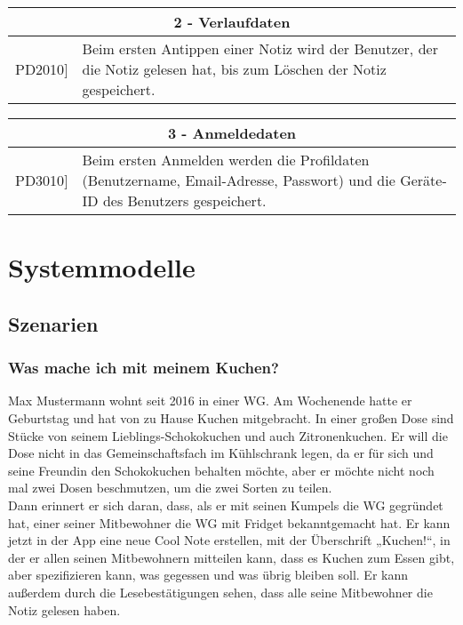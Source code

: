 \documentclass[a4paper]{scrreprt}
\begin{document}
        \vspace{5mm}
        
    	\begin{table}[h!]
    		\centering
    		\label{my-label}
    		\begin{tabular}{p{2cm}p{12cm}}
    			
    			\multicolumn{2}{c}{\textbf{2 - Verlaufdaten}} \\ \hline
    			\centering{[}PD2010{]} & Beim ersten Antippen einer Notiz wird der Benutzer, der die Notiz gelesen hat, bis zum Löschen der Notiz gespeichert.\\ 
    			\hline
    		\end{tabular}
    	\end{table}
    	
    	\vspace{5mm}
    	
    	\begin{table}[h!]
    		\centering
    		\label{my-label}
    		\begin{tabular}{p{2cm}p{12cm}}
    			
    			\multicolumn{2}{c}{\textbf{3 - Anmeldedaten}} \\ \hline
    			\centering{[}PD3010{]} & Beim ersten Anmelden werden die Profildaten (Benutzername, Email-Adresse, Passwort) und die Geräte-ID des Benutzers gespeichert.\\ 
    			\hline
    		\end{tabular}
    	\end{table}
    
    \chapter{Systemmodelle}
        \section{Szenarien}
        
        
        \subsection{Was mache ich mit meinem Kuchen?}
        Max Mustermann wohnt seit 2016 in einer WG. Am Wochenende hatte er Geburtstag und hat von zu Hause Kuchen mitgebracht. In einer großen Dose sind Stücke von seinem Lieblings-Schokokuchen und auch Zitronenkuchen. Er will die Dose nicht in das Gemeinschaftsfach im Kühlschrank legen, da er für sich und seine Freundin den Schokokuchen behalten möchte, aber er möchte nicht noch mal zwei Dosen beschmutzen, um die zwei Sorten zu teilen.\\
        Dann erinnert er sich daran, dass, als er mit seinen Kumpels die WG gegründet hat, einer seiner Mitbewohner die WG mit Fridget bekanntgemacht hat. Er kann jetzt in der App eine neue Cool Note erstellen, mit der Überschrift „Kuchen!“, in der er allen seinen Mitbewohnern mitteilen kann, dass es Kuchen zum Essen gibt, aber spezifizieren kann, was gegessen und was übrig bleiben soll. Er kann außerdem durch die Lesebestätigungen sehen, dass alle seine Mitbewohner die Notiz gelesen haben.
        \\
        
\end{document}
